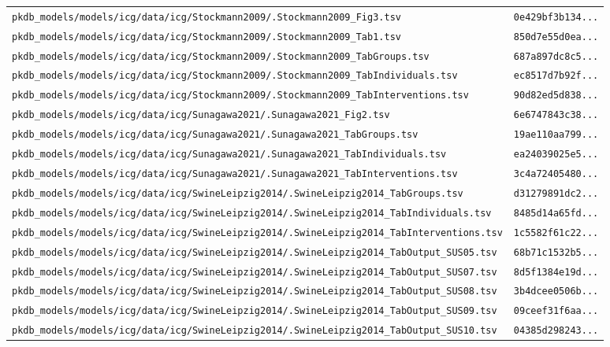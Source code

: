 \documentclass{article}
\begin{document}
\begin{longtable}{ll}
\texttt{pkdb\_models/models/icg/data/icg/Stockmann2009/.Stockmann2009\_Fig3.tsv} & \texttt{0e429bf3b134...} \\
\texttt{pkdb\_models/models/icg/data/icg/Stockmann2009/.Stockmann2009\_Tab1.tsv} & \texttt{850d7e55d0ea...} \\
\texttt{pkdb\_models/models/icg/data/icg/Stockmann2009/.Stockmann2009\_TabGroups.tsv} & \texttt{687a897dc8c5...} \\
\texttt{pkdb\_models/models/icg/data/icg/Stockmann2009/.Stockmann2009\_TabIndividuals.tsv} & \texttt{ec8517d7b92f...} \\
\texttt{pkdb\_models/models/icg/data/icg/Stockmann2009/.Stockmann2009\_TabInterventions.tsv} & \texttt{90d82ed5d838...} \\
\texttt{pkdb\_models/models/icg/data/icg/Sunagawa2021/.Sunagawa2021\_Fig2.tsv} & \texttt{6e6747843c38...} \\
\texttt{pkdb\_models/models/icg/data/icg/Sunagawa2021/.Sunagawa2021\_TabGroups.tsv} & \texttt{19ae110aa799...} \\
\texttt{pkdb\_models/models/icg/data/icg/Sunagawa2021/.Sunagawa2021\_TabIndividuals.tsv} & \texttt{ea24039025e5...} \\
\texttt{pkdb\_models/models/icg/data/icg/Sunagawa2021/.Sunagawa2021\_TabInterventions.tsv} & \texttt{3c4a72405480...} \\
\texttt{pkdb\_models/models/icg/data/icg/SwineLeipzig2014/.SwineLeipzig2014\_TabGroups.tsv} & \texttt{d31279891dc2...} \\
\texttt{pkdb\_models/models/icg/data/icg/SwineLeipzig2014/.SwineLeipzig2014\_TabIndividuals.tsv} & \texttt{8485d14a65fd...} \\
\texttt{pkdb\_models/models/icg/data/icg/SwineLeipzig2014/.SwineLeipzig2014\_TabInterventions.tsv} & \texttt{1c5582f61c22...} \\
\texttt{pkdb\_models/models/icg/data/icg/SwineLeipzig2014/.SwineLeipzig2014\_TabOutput\_SUS05.tsv} & \texttt{68b71c1532b5...} \\
\texttt{pkdb\_models/models/icg/data/icg/SwineLeipzig2014/.SwineLeipzig2014\_TabOutput\_SUS07.tsv} & \texttt{8d5f1384e19d...} \\
\texttt{pkdb\_models/models/icg/data/icg/SwineLeipzig2014/.SwineLeipzig2014\_TabOutput\_SUS08.tsv} & \texttt{3b4dcee0506b...} \\
\texttt{pkdb\_models/models/icg/data/icg/SwineLeipzig2014/.SwineLeipzig2014\_TabOutput\_SUS09.tsv} & \texttt{09ceef31f6aa...} \\
\texttt{pkdb\_models/models/icg/data/icg/SwineLeipzig2014/.SwineLeipzig2014\_TabOutput\_SUS10.tsv} & \texttt{04385d298243...} \\

\end{longtable}
\end{document}
